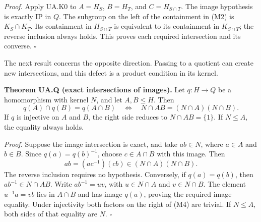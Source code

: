 \emph{Proof.} Apply UA.K0 to \(A=H_S\), \(B=H_T\), and
\(C=H_{S\cap T}\). The image hypothesis is exactly IP in \(Q\). The
subgroup on the left of the containment in (M2) is \(K_S\cap K_T\). Its
containment in \(H_{S\cap T}\) is equivalent to its containment in
\(K_{S\cap T}\); the reverse inclusion always holds. This proves each
required intersection and its converse. \(\square\)

The next result concerns the opposite direction. Passing to a quotient
can create new intersections, and this defect is a product condition in
its kernel.

\textbf{Theorem UA.Q (exact intersections of images).} Let \(q:H\to Q\)
be a homomorphism with kernel \(N\), and let \(A,B\leq H\). Then \[
q(A)\cap q(B)=q(A\cap B)
\quad\Longleftrightarrow\quad
N\cap AB=(N\cap A)(N\cap B).
\tag{M4}
\] If \(q\) is injective on \(A\) and \(B\), the right side reduces to
\(N\cap AB=\{1\}\). If \(N\leq A\), the equality always holds.

\emph{Proof.} Suppose the image intersection is exact, and take
\(ab\in N\), where \(a\in A\) and \(b\in B\). Since \(q(a)=q(b)^{-1}\),
choose \(c\in A\cap B\) with this image. Then \[
ab=(ac^{-1})(cb)\in(N\cap A)(N\cap B).
\] The reverse inclusion requires no hypothesis. Conversely, if
\(q(a)=q(b)\), then \(ab^{-1}\in N\cap AB\). Write \(ab^{-1}=uv\), with
\(u\in N\cap A\) and \(v\in N\cap B\). The element \(u^{-1}a=vb\) lies
in \(A\cap B\) and has image \(q(a)\), proving the required image
equality. Under injectivity both factors on the right of (M4) are
trivial. If \(N\leq A\), both sides of that equality are \(N\).
\(\square\)
